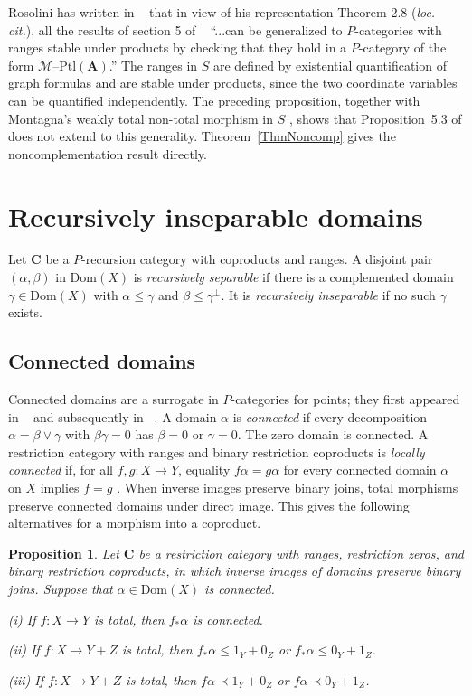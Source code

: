 \documentclass[letterpaper,10pt]{amsart}
\theoremstyle{plain}
\newtheorem{prop}{Proposition}[thm]
\theoremstyle{definition}
\newcommand{\MAP}[3]{{#1}:{#2}\rightarrow{#3}}
\begin{document}
Rosolini has written in  ~\cite[page 313]{MR90e:18001} that in view of his representation Theorem 2.8 ({\it loc. cit.}), all the results of section 5 of ~\cite{MR88i:03078} ``...can be generalized to $P$-categories with ranges stable under products by checking that they hold in a $P$-category of the form
$\mathcal{M}$--$\mathrm{Ptl}(\mathbf{A})$.'' The ranges in $S$ are defined
by existential quantification of graph formulas \cite[p.~111]{MR90i:03046}
and are stable under products, since the two coordinate variables can
be quantified independently. The preceding proposition,
together with Montagna's weakly total non-total morphism in $S$
\cite[Example~1, p.~112]{MR90i:03046}, shows that Proposition~5.3 of
\cite{MR88i:03078} does not extend to this generality. Theorem~\ref{ThmNoncomp} gives the noncomplementation result directly.

\section{Recursively inseparable domains}\label{sec:inseparability}

Let $\mathbf C$ be a $P$-recursion category with coproducts and ranges.
A disjoint pair $(\alpha,\beta)$ in $\mathrm{Dom}(X)$ is
\textit{recursively separable} if there is a complemented domain
$\gamma\in\mathrm{Dom}(X)$ with $\alpha\le\gamma$ and
$\beta\le\gamma^\perp$. It is \textit{recursively inseparable}
if no such $\gamma$ exists.

\subsection{Connected domains}
Connected domains are a surrogate in $P$-categories for points; they  first appeared in ~\cite{MR92e:03067} and subsequently in ~\cite{MR93b:03103,leng}.
A domain $\alpha$ is \textit{connected} if every decomposition
$\alpha=\beta\vee\gamma$ with $\beta\gamma=0$ has $\beta=0$ or
$\gamma=0$. The zero domain is connected. A restriction category with
ranges and binary restriction coproducts is \textit{locally connected}
if, for all $f,g:X\to Y$, equality $f\alpha=g\alpha$ for every
connected domain $\alpha$ on $X$ implies $f=g$ \cite{MR92e:03067}.
When inverse images preserve binary joins, total morphisms preserve
connected domains under direct image. This gives the following
alternatives for a morphism into a coproduct.

\begin{prop}\label{PropAlternative}
Let $\mathbf C$ be a restriction category with ranges, restriction zeros,
and binary restriction coproducts, in which inverse images of domains
preserve binary joins. Suppose that $\alpha\in\mathrm{Dom}(X)$ is
connected.

\noindent(i) If $\MAP{f}{X}{Y}$ is total, then $f_*\alpha$ is connected.

\noindent(ii) If $\MAP{f}{X}{Y + Z}$ is total,
then $f_*\alpha\le 1_Y+0_Z$ or $f_*\alpha\le 0_Y+ 1_Z$.

\noindent(iii) If $\MAP{f}{X}{Y+ Z}$ is total,
then $f\alpha\prec 1_Y+0_Z$ or $f\alpha\prec 0_Y+1_Z$.
\end{prop}
\end{document}
